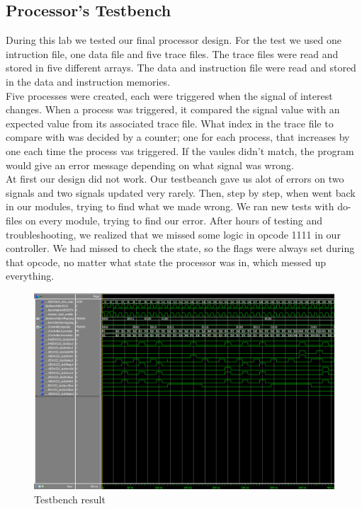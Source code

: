 \documentclass[a4paper]{article}
\begin{document}
\subsection{Processor's Testbench}

During this lab we tested our final processor design.
For the test we used one intruction file, one data file and five trace files.
The trace files were read and stored in five different arrays.
The data and instruction file were read and stored in the data and instruction memories.\\
Five processes were created, each were triggered when the signal of interest changes.
When a process was triggered, it compared the signal value with an expected value from its associated trace file. What index in the trace file to compare with was decided by a counter; one for each process, that increases by one each time the process vas triggered.
If the vaules didn't match, the program would give an error message depending on what signal was wrong.\\
At first our design did not work. Our testbeanch gave us alot of errors on two signals and two signals updated very rarely. 
Then, step by step, when went back in our modules, trying to find what we made wrong.
We ran new tests with do-files on every module, trying to find our error.
After hours of testing and troubleshooting, we realized that we missed some logic in opcode 1111 in our controller. We had missed to check the state, so the flags were always set during that opcode, no matter what state the processor was in, which messed up everything.

\begin{figure}[H]
 \centering
 \includegraphics[scale=0.4]{lab4}
 \caption{Testbench result}
\end{figure}
\end{document}
